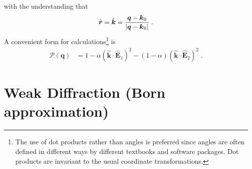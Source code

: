 \documentclass[12pt]{article}
\renewcommand{\vec}[1]{\boldsymbol{#1}}
\newcommand{\hvec}[1]{\hat{\vec{#1}}}
\begin{document}
with the understanding that 
\begin{align}
 \hvec{r} = \hvec{k} = \frac{\vec{q} - \vec{k}_0}{\abs{\vec{q} - \vec{k}_0}} \;.
\end{align}
A convenient form for calculations\footnote{The use of dot products rather 
than angles is preferred since angles are often defined in different ways by 
different textbooks and software packages.  Dot products are invariant to the 
usual coordinate transformations.} is
\begin{align}
 \mathcal{P}(\vec{q}) &= 1 - \alpha(\hvec{k} \cdot \hvec{E}_1 )^2 - 
(1-\alpha)(\hvec{k} \cdot \hvec{E}_2 )^2 \;.
\end{align}



\section{Weak Diffraction (Born approximation)}
\end{document}
